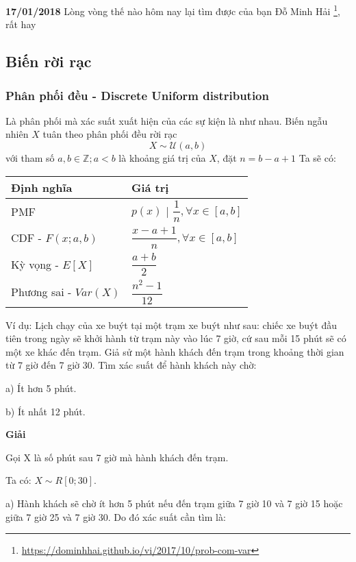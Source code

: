 \textbf{17/01/2018} Lòng vòng thế nào hôm nay lại tìm được của bạn Đỗ Minh Hải \footnote{\href{https://dominhhai.github.io/vi/2017/10/prob-com-var}{https://dominhhai.github.io/vi/2017/10/prob-com-var}}, rất hay

\subsection{Biến rời rạc}

\subsubsection{Phân phối đều - Discrete Uniform distribution}

Là phân phối mà xác suất xuất hiện của các sự kiện là như nhau.
\newline
Biến ngẫu nhiên $X$ tuân theo phân phối đều rời rạc
$$X \sim \mathcal{U} (a, b)$$
với tham số $a, b \in \mathbb Z; a < b$ là khoảng giá trị của $X$, đặt $n = b-a+1$
\newline
Ta sẽ có:
\newline
\begin{tabular}{ | l | l | }
  \hline
  Định nghĩa & Giá trị \\
  \hline
  PMF & $p(x)$ | $\dfrac{1}{n}, \forall x \in [a,b]$ \\
  \hline
  CDF - $F(x;a,b)$ & $\dfrac{x-a+1}{n}, \forall x \in [a,b]$ \\
  \hline
  Kỳ vọng - $E[X]$ & $\dfrac{a+b}{2}$ \\
  \hline
  Phương sai - $Var(X)$ & $\dfrac{n^2-1}{12}$ \\
  \hline
\end{tabular}
\newline
Ví dụ: Lịch chạy của xe buýt tại một trạm xe buýt như sau: chiếc xe buýt đầu tiên trong ngày sẽ khởi hành từ trạm này vào lúc 7 giờ, cứ sau mỗi 15 phút sẽ có một xe khác đến trạm. Giả sử một hành khách đến trạm trong khoảng thời gian từ 7 giờ đến 7 giờ 30. Tìm xác suất để hành khách này chờ:

a) Ít hơn 5 phút.

b) Ít nhất 12 phút.

\textbf{Giải}

Gọi X là số phút sau 7 giờ mà hành khách đến trạm.

Ta có: $X \sim R[0;30]$.

a) Hành khách sẽ chờ ít hơn 5 phút nếu đến trạm giữa 7 giờ 10 và 7 giờ 15 hoặc giữa 7 giờ 25 và 7 giờ 30. Do đó xác suất cần tìm là:

